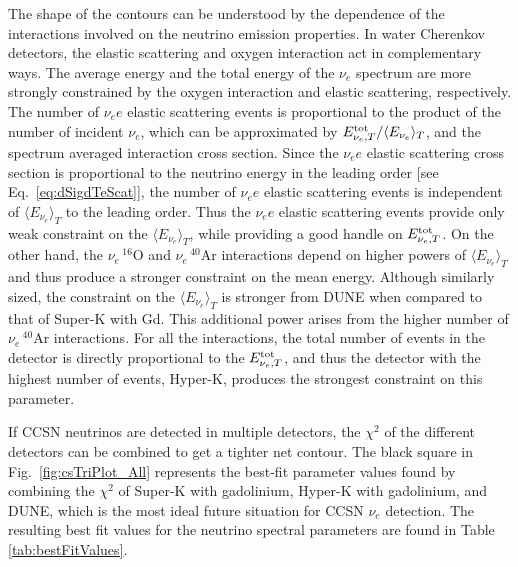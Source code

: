 \documentclass[aps,reprint,superscriptaddress]{revtex4-1}
\begin{document}
The shape of the contours can be understood by the dependence of the interactions involved on the neutrino emission properties. In water Cherenkov detectors, the elastic scattering and oxygen interaction act in complementary ways. The average energy and the total energy of the $\nu_e$ spectrum are more strongly constrained by the oxygen interaction and elastic scattering, respectively. The number of $\nu_e e$ elastic scattering events is proportional to the product of the number of incident $\nu_e$, which can be approximated by $E^{\rm tot}_{\nu_e, T}/\langle E_{\nu_e} \rangle_T$, and the spectrum averaged interaction cross section. Since the $\nu_e e$ elastic scattering cross section is proportional to the neutrino energy in the leading order [see Eq.~\ref{eq:dSigdTeScat}], the number of $\nu_e e$ elastic scattering events is independent of $\langle E_{\nu_e} \rangle_T$ to the leading order. Thus the $\nu_e e$ elastic scattering events provide only weak constraint on the $\langle E_{\nu_e} \rangle_T$, while providing a good handle on $E^{\rm tot}_{\nu_e, T}$. On the other hand, the $\nu_e \, ^{16}$O and $\nu_e \, ^{40}$Ar interactions depend on higher powers of $\langle E_{\nu_e} \rangle_T$ and thus produce a stronger constraint on the mean energy.  Although similarly sized, the constraint on the $\langle E_{\nu_e} \rangle_T$ is stronger from DUNE when compared to that of Super-K with Gd.  This additional power arises from the higher number of $\nu_e \, ^{40}$Ar interactions.  For all the interactions, the total number of events in the detector is directly proportional to the $E^{\rm tot}_{\nu_e, T}$, and thus the detector with the highest number of events, Hyper-K, produces the strongest constraint on this parameter.

If  CCSN  neutrinos are detected in multiple detectors, the $\chi^{2}$ of the different detectors can be combined to get a tighter net contour. The black square in Fig.~\ref{fig:csTriPlot_All} represents the best-fit parameter values found by combining the $\chi^{2}$ of Super-K with gadolinium, Hyper-K with gadolinium, and DUNE, which is the most ideal future situation for  CCSN  $\nu_{e}$ detection. The resulting best fit values for the neutrino spectral parameters are found in Table \ref{tab:bestFitValues}.
\end{document}
